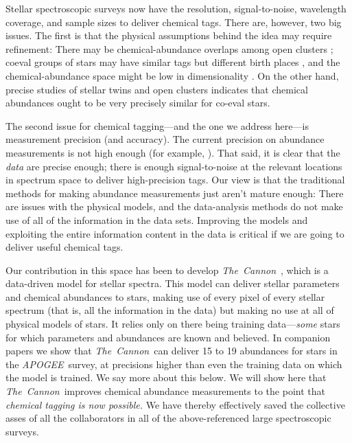 \documentclass[12pt, letterpaper, preprint]{aastex}
\newcommand{\acronym}[1]{{\small{#1}}}
\newcommand{\project}[1]{\textsl{#1}}
\newcommand{\apogee}{\project{\acronym{APOGEE}}}
\newcommand{\thecannon}{\project{The~Cannon}}
\begin{document}
Stellar spectroscopic surveys now have the resolution, signal-to-noise,
wavelength coverage, and sample sizes to deliver chemical tags.
There are, however, two big issues.
The first is that the physical assumptions behind the idea may require
refinement:
There may be chemical-abundance overlaps among open clusters
\citep{blancocuaresma}; coeval groups of stars may have similar tags
but different birth places \citep{mitschang}, and the
chemical-abundance space might be low in dimensionality \citep{what}.
On the other hand, precise studies of stellar twins \citep{melendez, jofre}
and open clusters \citep{bovy} indicates that chemical abundances ought to be
very precisely similar for co-eval stars.

The second issue for chemical tagging---and the one we address
here---is measurement precision (and accuracy).
The current precision on abundance measurements is not high enough
(for example, \citealt{martel, ting}).
That said, it is clear that the \emph{data} are precise enough;
there is enough signal-to-noise at the relevant locations in spectrum
space to deliver high-precision tags.
Our view is that the traditional methods for making abundance
measurements just aren't mature enough:
There are issues with the physical models, and the data-analysis
methods do not make use of all of the information in the data sets.
Improving the models and exploiting the entire information
content in the data is critical if we are going to deliver useful
chemical tags.

Our contribution in this space has been to develop
\thecannon\ \citep{thecannon, ages}, which is a data-driven model for
stellar spectra.
This model can deliver stellar parameters and chemical abundances to
stars, making use of every pixel of every stellar spectrum (that is,
all the information in the data) but making no use at all of physical
models of stars.
It relies only on there being training data---\emph{some} stars for
which parameters and abundances are known and believed.
In companion papers \citep{casey16, ness16} we show that
\thecannon\ can deliver 15 to 19 abundances for stars in the
\apogee\ survey, at precisions higher than even the training data on
which the model is trained.
We say more about this below.
We will show here that \thecannon\ improves chemical abundance measurements
to the point that \emph{chemical tagging is now possible.}
We have thereby effectively saved the collective asses of all the
collaborators in all of the above-referenced large spectroscopic
surveys.
\end{document}
